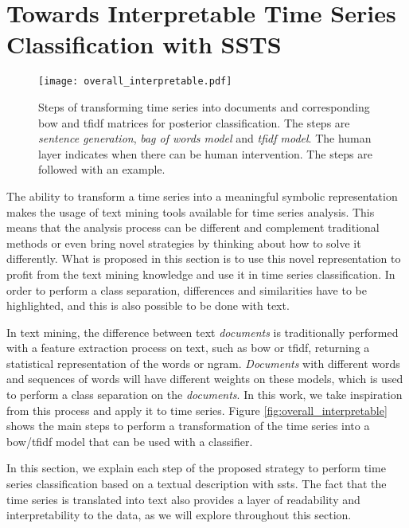\section{Towards Interpretable Time Series Classification with SSTS}

\begin{figure}
\centering
\texttt{[image: overall\_interpretable.pdf]}
\label{fig:ssts_interpretable}
\caption{Steps of transforming time series into documents and corresponding \gls{bow} and \gls{tfidf} matrices for posterior classification. The steps are \textit{sentence generation}, \textit{bag of words model} and \textit{tfidf model}. The human layer indicates when there can be human intervention. The steps are followed with an example.}
\end{figure}


The ability to transform a time series into a meaningful symbolic representation makes the usage of text mining tools available for time series analysis. This means that the analysis process can be different and complement traditional methods or even bring novel strategies by thinking about how to solve it differently. What is proposed in this section is to use this novel representation to profit from the text mining knowledge and use it in time series classification. In order to perform a class separation, differences and similarities have to be highlighted, and this is also possible to be done with text.
\par
In text mining, the difference between text \textit{documents} is traditionally performed with a feature extraction process on text, such as \gls{bow} or \gls{tfidf}, returning a statistical representation of the words or ngram. \textit{Documents} with different words and sequences of words will have different weights on these models, which is used to perform a class separation on the \textit{documents}. In this work, we take inspiration from this process and apply it to time series. Figure \ref{fig:overall_interpretable} shows the main steps to perform a transformation of the time series into a \gls{bow}/\gls{tfidf} model that can be used with a classifier. 
\par
In this section, we explain each step of the proposed strategy to perform time series classification based on a textual description with \gls{ssts}. The fact that the time series is translated into text also provides a layer of readability and interpretability to the data, as we will explore throughout this section.

